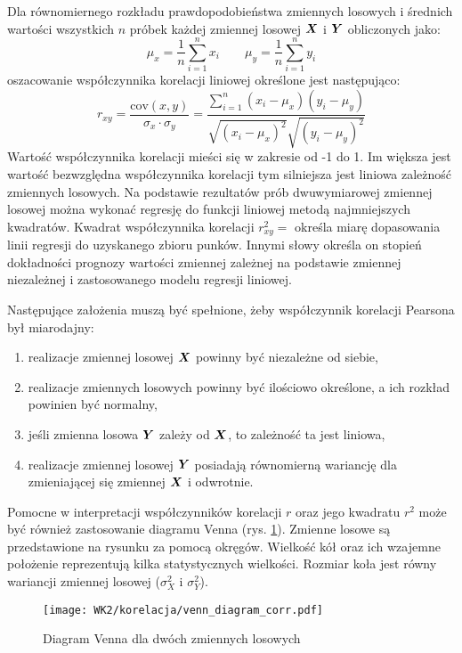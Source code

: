 \begin{appendices}
Dla równomiernego rozkładu prawdopodobieństwa zmiennych losowych i średnich wartości wszystkich $n$ próbek każdej zmiennej losowej $\bm{X}$ i $\bm{Y}$ obliczonych jako:
\begin{equation}
\mu_x=\frac{1}{n}\sum_{i=1}^{n}x_i \qquad \mu_y=\frac{1}{n}\sum_{i=1}^{n}y_i
\end{equation}
oszacowanie współczynnika korelacji liniowej określone jest następująco:
\begin{equation}
	r_{xy}=\frac{\mathrm{cov}(x,y)}{\sigma_x\cdot\sigma_y}=\frac{\sum_{i=1}^{n}(x_i-\mu_x)(y_i-\mu_y)}{\sqrt{(x_i-\mu_x)^2}\sqrt{(y_i-\mu_y)^2}}
\end{equation}
Wartość współczynnika korelacji mieści się w zakresie od -1 do 1. Im większa jest wartość bezwzględna współczynnika korelacji tym silniejsza jest liniowa zależność zmiennych losowych. Na podstawie rezultatów prób dwuwymiarowej zmiennej losowej można wykonać regresję do funkcji liniowej metodą najmniejszych kwadratów. Kwadrat współczynnika korelacji $r_{xy}^2=$ określa miarę dopasowania linii regresji do uzyskanego zbioru punków. Innymi słowy określa on stopień dokładności prognozy wartości zmiennej zależnej na podstawie zmiennej niezależnej i zastosowanego modelu regresji liniowej.

Następujące założenia muszą być spełnione, żeby współczynnik korelacji Pearsona był miarodajny:
\begin{enumerate}
	\item realizacje zmiennej losowej $\bm{X}$ powinny być niezależne od siebie,
	\item realizacje zmiennych losowych powinny być ilościowo określone, a ich rozkład powinien być normalny,
	\item jeśli zmienna losowa $\bm{Y}$ zależy od $\bm{X}$, to zależność ta jest liniowa,
	\item realizacje zmiennej losowej $\bm{Y}$ posiadają równomierną wariancję dla zmieniającej się zmiennej $\bm{X}$ i odwrotnie.
\end{enumerate}

Pomocne w interpretacji współczynników korelacji $r$ oraz jego kwadratu $r^2$ może być również zastosowanie diagramu Venna (rys. \ref{fig:venn_diag_corr}). Zmienne losowe są przedstawione na rysunku za pomocą okręgów. Wielkość kół oraz ich wzajemne położenie reprezentują kilka statystycznych wielkości. Rozmiar koła jest równy wariancji zmiennej losowej ($\sigma_X^2$ i $\sigma_Y^2$). 

\begin{figure}[hbt!]
	\centering
	\texttt{[image: WK2/korelacja/venn\_diagram\_corr.pdf]}
	\captionsetup{justification=centering}
	\caption{Diagram Venna dla dwóch zmiennych losowych}
	\label{fig:venn_diag_corr}
\end{figure}


\end{appendices}
